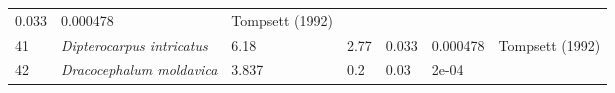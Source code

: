 \documentclass[]{article}
\begin{document}
\begin{longtable}[]{@{}lllllll@{}}
\begin{minipage}[t]{0.08\columnwidth}
0.033\strut
\end{minipage} & \begin{minipage}[t]{0.08\columnwidth}\raggedright
0.000478\strut
\end{minipage} & \begin{minipage}[t]{0.23\columnwidth}\raggedright
Tompsett (1992)\strut
\end{minipage}\tabularnewline
\begin{minipage}[t]{0.05\columnwidth}\raggedright
41\strut
\end{minipage} & \begin{minipage}[t]{0.23\columnwidth}\raggedright
\emph{Dipterocarpus intricatus}\strut
\end{minipage} & \begin{minipage}[t]{0.05\columnwidth}\raggedright
6.18\strut
\end{minipage} & \begin{minipage}[t]{0.08\columnwidth}\raggedright
2.77\strut
\end{minipage} & \begin{minipage}[t]{0.08\columnwidth}\raggedright
0.033\strut
\end{minipage} & \begin{minipage}[t]{0.08\columnwidth}\raggedright
0.000478\strut
\end{minipage} & \begin{minipage}[t]{0.23\columnwidth}\raggedright
Tompsett (1992)\strut
\end{minipage}\tabularnewline
\begin{minipage}[t]{0.05\columnwidth}\raggedright
42\strut
\end{minipage} & \begin{minipage}[t]{0.23\columnwidth}\raggedright
\emph{Dracocephalum moldavica}\strut
\end{minipage} & \begin{minipage}[t]{0.05\columnwidth}\raggedright
3.837\strut
\end{minipage} & \begin{minipage}[t]{0.08\columnwidth}\raggedright
0.2\strut
\end{minipage} & \begin{minipage}[t]{0.08\columnwidth}\raggedright
0.03\strut
\end{minipage} & \begin{minipage}[t]{0.08\columnwidth}\raggedright
2e-04\strut
\end{minipage} & \begin{minipage}[t]{0.23\columnwidth}\raggedright

\end{minipage}
\end{longtable}
\end{document}
